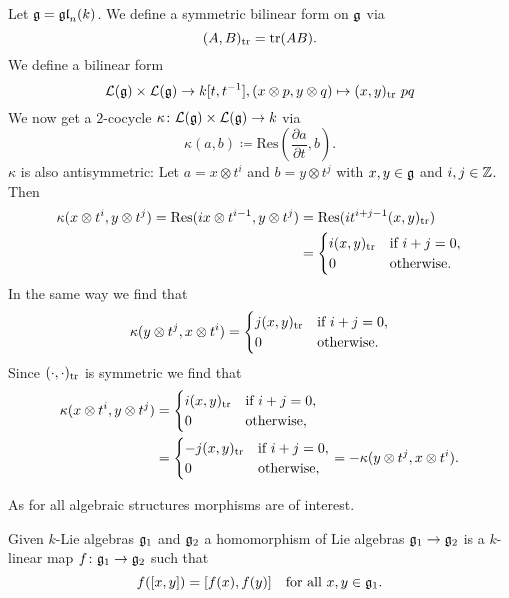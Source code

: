 \begin{expl}
 Let $\mathfrak{g} = \mathfrak{gl}_n(k)$. We define a symmetric bilinear form on $\mathfrak{g}$ via
 \[
  (A,B)_{\operatorname{tr}} = \operatorname{tr}(AB).
 \]
 We define a bilinear form
 \[
  \mathcal{L}(\mathfrak{g}) \times \mathcal{L}(\mathfrak{g}) \to k[t,t^{-1}],
  (x \otimes p, y \otimes q) \mapsto (x,y)_{\operatorname{tr}}\ pq
 \]
 We now get a $2$-cocycle $\kappa \colon \mathcal{L}(\mathfrak{g}) \times \mathcal{L}(\mathfrak{g}) \to k$ via
 \[
  \kappa(a,b) \coloneqq \mathrm{Res}\left(\frac{\partial a}{\partial t}, b\right).
 \]
 $\kappa$ is also antisymmetric: Let $a = x \otimes t^i$ and $b = y \otimes t^j$ with $x,y \in \mathfrak{g}$ and $i,j \in \mathbb{Z}$. Then
 \begin{align*}
  \kappa(x \otimes t^i, y \otimes t^j)
  = \mathrm{Res}(i x \otimes t^{i-1}, y \otimes t^j)
  &= \mathrm{Res}(i t^{i+j-1} (x,y)_{\operatorname{tr}}) \\
  &=
  \begin{cases}
   i (x,y)_{\operatorname{tr}} & \text{if $i+j = 0$}, \\
               0 & \text{otherwise}.
  \end{cases}
 \end{align*}
 In the same way we find that
 \[
  \kappa(y \otimes t^j, x \otimes t^i) =
  \begin{cases}
   j (x,y)_{\operatorname{tr}} & \text{if $i+j = 0$}, \\
               0 & \text{otherwise}.
  \end{cases}
 \]
 Since $(\cdot,\cdot)_{\operatorname{tr}}$ is symmetric we find that
 \begin{align*}
  \kappa(x \otimes t^i, y \otimes t^j)
  &=
  \begin{cases}
   i (x,y)_{\operatorname{tr}} & \text{if $i+j = 0$}, \\
               0 & \text{otherwise},
  \end{cases} \\
  &=
  \begin{cases}
   -j (x,y)_{\operatorname{tr}} & \text{if $i+j = 0$}, \\
                0 & \text{otherwise},
  \end{cases}
  =
  -\kappa(y \otimes t^j, x \otimes t^i).
 \end{align*}
\end{expl}


As for all algebraic structures morphisms are of interest.


\begin{defi}
 Given $k$-Lie algebras $\mathfrak{g}_1$ and $\mathfrak{g}_2$ a homomorphism of Lie algebras $\mathfrak{g}_1 \to \mathfrak{g}_2$ is a $k$-linear map $f \colon \mathfrak{g}_1 \to \mathfrak{g}_2$ such that
 \[
  f([x,y]) =[f(x),f(y)] \quad \text{for all $x,y \in \mathfrak{g}_1$}.
 \]
\end{defi}


